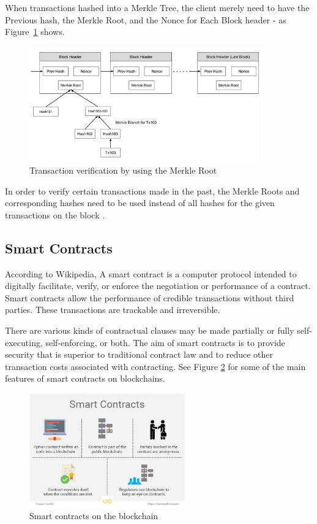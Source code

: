 \documentclass[a4paper]{article}
\begin{document}
When transactions hashed into a Merkle Tree, the client merely need to have the Previous hash, the Merkle Root, and the Nonce for Each Block header - as Figure~\ref{fig:merkle_verif} shows. 

\begin{figure}[H]
    \centering
    \includegraphics[width=0.9\textwidth]{figures/payment_verification.jpg}
    \caption{Transaction verification by using the Merkle Root \cite{tutorialspoint}}
    \label{fig:merkle_verif}
\end{figure}

In order to verify certain transactions made in the past, the Merkle Roots and corresponding hashes need to be used instead of all hashes for the given transactions on the block \cite{IOTA_Merkle}. 



\subsection{Smart Contracts}

According to Wikipedia, \cite{Wiki_SC} A smart contract is a computer protocol intended to digitally facilitate, verify, or enforce the negotiation or performance of a contract. Smart contracts allow the performance of credible transactions without third parties. These transactions are trackable and irreversible.

There are various kinds of contractual clauses may be made partially or fully self-executing, self-enforcing, or both. The aim of smart contracts is to provide security that is superior to traditional contract law and to reduce other transaction costs associated with contracting. See Figure \ref{fig:smartcontracts} for some of the main features of smart contracts on blockchains.

\begin{figure}[H]
    \centering
    \includegraphics[width=0.6\textwidth]{figures/smart-contracts-01.png}
    \caption{Smart contracts on the blockchain}
    \label{fig:smartcontracts}
\end{figure}
\end{document}
